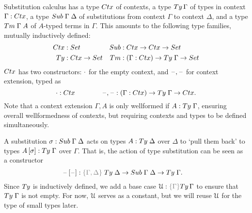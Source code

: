 \documentclass[a4paper,UKenglish,numberwithinsect,cleveref,thm-restate]{lipics-v2021}
\begin{document}
Substitution calculus has a type $\Ctx$ of contexts, a type $\Ty\,\Gamma$ of types in context $\Gamma : \Ctx$, a type $\Sub\;\Gamma\;\Delta$ of substitutions from context $\Gamma$ to context $\Delta$, and a type $\Tm\;\Gamma\;A$ of $A$-typed terms in $\Gamma$. 
This amounts to the following type families, mutually inductively defined:
\begin{align*}
  \Ctx   & : \Set                   & \Sub   & : \Ctx \to \Ctx \to \Set \\
  \Ty    & : \Ctx \to \Set          & \Tm    & : (\Gamma : \Ctx) \to \Ty\;\Gamma \to \Set
\end{align*}
$\Ctx$ has two constructors: $\cdot$ for the empty context, and $\mathord{\hspace{1pt}\text{--}\hspace{1pt}},\mathord{\hspace{1pt}\text{--}\hspace{1pt}}$ for context extension, typed as
\[
  \emptyctx : \Ctx
  \qquad\qquad
  \blank,\blank : (\Gamma : \Ctx) \to \Ty\;\Gamma \to \Ctx.
\]
Note that a context extension $\Gamma , A$ is only wellformed if $A : \Ty\;\Gamma$, ensuring overall wellformedness of contexts, but requiring contexts and types to be defined simultaneously.

A substitution $\sigma : \Sub\;\Gamma\;\Delta$ acts on types $A : \Ty\;\Delta$ over $\Delta$ to `pull them back' to types $\sub{A}{\sigma} : \Ty\;\Gamma$ over $\Gamma$. That is, the action of type substitution can be seen as a constructor
\begin{alignat*}{3}
  \sub{\blank}{\blank} &: \implicit{\Gamma, \Delta} \; \Ty\;\Delta \to \Sub\;\Gamma\;\Delta \to \Ty\;\Gamma .
\end{alignat*}
%
Since $\Ty$ is inductively defined, we add a base case $\UU : \implicit{\Gamma} \Ty\,\Gamma$ to ensure that $\Ty\;\Gamma$ is not empty.
%
For now, $\mathcal{U}$ serves as a constant, but we will reuse $\mathcal{U}$ for the type of small types later.
\end{document}
